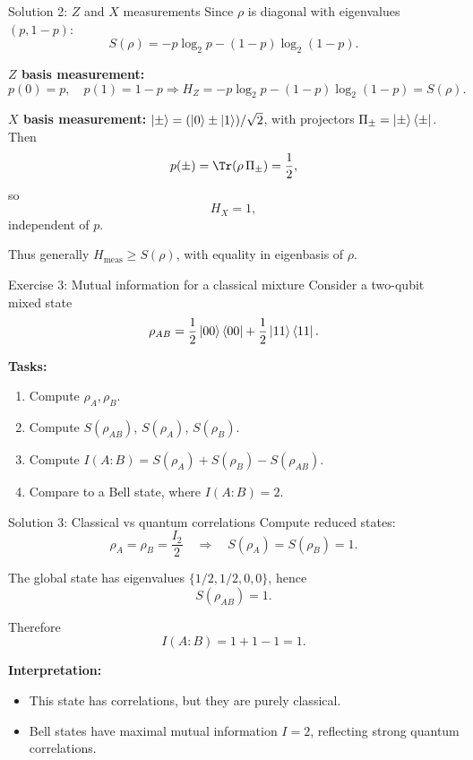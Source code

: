 \documentclass[aspectratio=169]{beamer}
\begin{document}
\begin{frame}{Solution 2: $Z$ and $X$ measurements}
Since $\rho$ is diagonal with eigenvalues $(p,1-p)$:
\[
S(\rho)=-p\log_2 p-(1-p)\log_2(1-p).
\]

\medskip
\textbf{$Z$ basis measurement:}
\[
p(0)=p,\quad p(1)=1-p
\Rightarrow
H_Z=-p\log_2 p-(1-p)\log_2(1-p)=S(\rho).
\]

\medskip
\textbf{$X$ basis measurement:}
$\ket{\pm}=(\ket{0}\pm\ket{1})/\sqrt{2}$, with projectors $\Pi_\pm=\ket{\pm}\bra{\pm}$.
Then
\[
p(\pm)=\Tr(\rho\,\Pi_\pm)=\frac{1}{2},
\]
so
\[
H_X=1,
\]
independent of $p$.

\medskip
Thus generally $H_{\text{meas}}\ge S(\rho)$, with equality in eigenbasis of $\rho$.
\end{frame}

\begin{frame}{Exercise 3: Mutual information for a classical mixture}
Consider a two-qubit mixed state
\[
\rho_{AB}= \frac{1}{2}\ket{00}\bra{00}+\frac{1}{2}\ket{11}\bra{11}.
\]

\textbf{Tasks:}
\begin{enumerate}
\item Compute $\rho_A,\rho_B$.
\item Compute $S(\rho_{AB})$, $S(\rho_A)$, $S(\rho_B)$.
\item Compute $I(A\!:\!B)=S(\rho_A)+S(\rho_B)-S(\rho_{AB})$.
\item Compare to a Bell state, where $I(A\!:\!B)=2$.
\end{enumerate}
\end{frame}

\begin{frame}{Solution 3: Classical vs quantum correlations}
Compute reduced states:
\[
\rho_A=\rho_B=\frac{I_2}{2}\quad\Rightarrow\quad S(\rho_A)=S(\rho_B)=1.
\]

The global state has eigenvalues $\{1/2,1/2,0,0\}$, hence
\[
S(\rho_{AB})=1.
\]

Therefore
\[
I(A\!:\!B)=1+1-1=1.
\]

\medskip
\textbf{Interpretation:}
\begin{itemize}
\item This state has correlations, but they are purely classical.
\item Bell states have maximal mutual information $I=2$, reflecting strong quantum correlations.
\end{itemize}
\end{frame}
\end{document}
